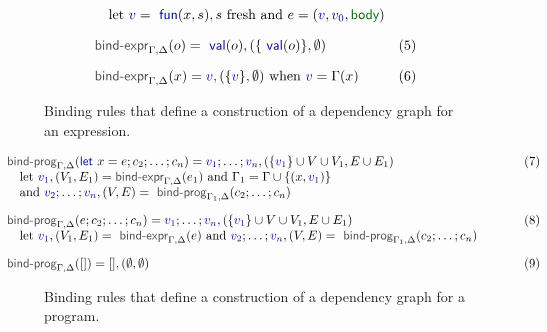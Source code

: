 \documentclass[acmsmall,anonymous,fleqn]{acmart}\settopmatter{printfolios=false,printccs=false,printacmref=false}
\theoremstyle{plain}
\theoremstyle{definition}
\newcommand{\ident}[1]{\textnormal{\textcolor{idclr}{\sffamily #1}}}
\newcommand{\kvd}[1]{\textnormal{\textcolor{kvdclr}{\sffamily #1}}}
\newcommand{\bndclr}[1]{\textcolor{kvdclr}{#1}}
\newcommand{\bnd}[1]{\textnormal{\textcolor{kvdclr}{\sffamily #1}}}
\newcommand{\blbl}[1]{\textnormal{\textcolor{numclr}{\sffamily #1}}}
\begin{document}
\begin{figure}[t]
\begin{equation*}
\begin{array}{ll}
\quad \textnormal{let}~\bndclr{v} = \bnd{fun}(x, s), s~\textnormal{fresh}
~\textnormal{and}~e = (\bndclr{v},\bndclr{v_0},\blbl{body})
\\[1em]
\ident{bind-expr}_{\Gamma, \Delta}(o) = \bnd{val}(o), (\{ \bnd{val}(o) \}, \emptyset) &(5)
\\[1em]
\ident{bind-expr}_{\Gamma, \Delta}(x) = \bndclr{v}, (\{ \bndclr{v} \}, \emptyset)~\textnormal{when}~\bndclr{v} = \Gamma(x)&(6)
\end{array}
\end{equation*}
\caption{Binding rules that define a construction of a dependency graph for an expression.}
\label{fig:binding-rules-expr}
\end{figure}


\begin{figure}[t]
\begin{equation*}
\hspace{-3.5em}
\begin{array}{ll}
\ident{bind-prog}_{\Gamma, \Delta}(\kvd{let}~x=e; c_2; \ldots; c_n) = \bndclr{v_1};\ldots;\bndclr{v_n}, (\{\bndclr{v_1}\} \cup V \cup V_1, E \cup E_1)
  \hspace{9.35em}&(7)\\
\quad \textnormal{let}~\bndclr{v_1}, (V_1,E_1) = \ident{bind-expr}_{\Gamma,\Delta}(e_1)~\textnormal{and}~\Gamma_1 = \Gamma \cup \{(x,\bndclr{v_1})\} \\
\quad \textnormal{and}~\bndclr{v_2}; \ldots; \bndclr{v_n}, (V, E) = \ident{bind-prog}_{\Gamma_1, \Delta}(c_2; \ldots; c_n)
\\[1em]
\ident{bind-prog}_{\Gamma, \Delta}(e; c_2; \ldots; c_n) = \bndclr{v_1};\ldots;\bndclr{v_n}, (\{\bndclr{v_1}\} \cup V \cup V_1, E \cup E_1)&(8)\\
\quad \textnormal{let}~\bndclr{v_1}, (V_1,E_1) = \ident{bind-expr}_{\Gamma,\Delta}(e)
~\textnormal{and}~\bndclr{v_2}; \ldots; \bndclr{v_n}, (V, E) = \ident{bind-prog}_{\Gamma_1, \Delta}(c_2; \ldots; c_n)
\\[1em]
\ident{bind-prog}_{\Gamma, \Delta}([]) = [], (\emptyset, \emptyset)&(9)
\end{array}
\end{equation*}
\caption{Binding rules that define a construction of a dependency graph for a program.}
\label{fig:binding-rules-prog}
\end{figure}


\end{document}
